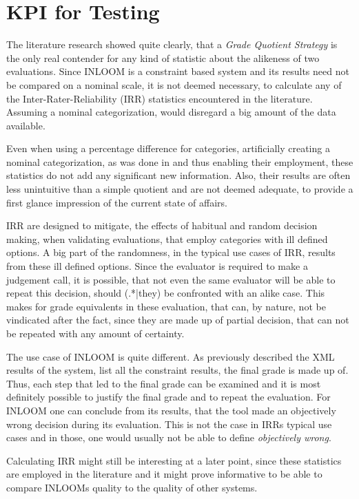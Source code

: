 \section{KPI for Testing}

The literature research showed quite clearly, that a \textit{Grade Quotient Strategy} is 
the only real contender for any kind of statistic about the alikeness of two evaluations.
Since INLOOM is a constraint based system and its results need not be compared on a nominal
scale, it is not deemed necessary, to calculate any of the Inter-Rater-Reliability (IRR) 
statistics encountered in the literature. Assuming a nominal categorization, would disregard 
a big amount of the data available. 

Even when using a percentage difference for categories, artificially creating a nominal 
categorization, as was done in \cite{28} and thus enabling their employment, these statistics
do not add any significant new information. Also, their results are often less unintuitive 
than a simple quotient and are not deemed adequate, to provide a first glance impression of 
the current state of affairs. 

IRR are designed to mitigate, the effects of habitual and random decision making, when 
validating evaluations, that employ categories with ill defined options. A big part of the 
randomness, in the typical use cases of IRR, results from these ill defined options. 
Since the evaluator is required to make a judgement call, it is possible, that not even the
same evaluator will be able to repeat this decision, should (.*|they) be confronted with 
an alike case. This makes for grade equivalents in these evaluation, that can, by nature, not
be vindicated after the fact, since they are made up of partial decision, that can not be 
repeated with any amount of certainty.

The use case of INLOOM is quite different. As previously described the XML results of the 
system, list all the constraint results, the final grade is made up of. Thus, each step that
led to the final grade can be examined and it is most definitely possible to justify the final
grade and to repeat the evaluation.
For INLOOM one can conclude from its results, that the tool made an objectively wrong decision
during its evaluation. This is not the case in IRRs typical use cases and in those, one would
usually not be able to define \textit{objectively wrong}. 

Calculating IRR might still be interesting at a later point, since these statistics are 
employed in the literature and it might prove informative to be able to compare INLOOMs 
quality to the quality of other systems. 

